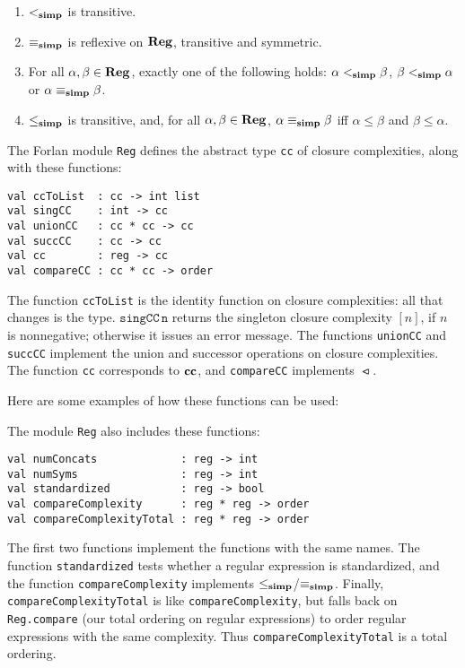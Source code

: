 \begin{proposition}
\begin{enumerate}[\quad(1)]
\item $\mathrel{<_{\mathbf{simp}}}$ is transitive.

\item $\mathrel{\equiv_{\mathbf{simp}}}$ is reflexive on $\mathbf{Reg}$, transitive and symmetric.

\item For all $\alpha,\beta\in\mathbf{Reg}$, exactly one of the following holds:
$\alpha\mathrel{<_{\mathbf{simp}}}\beta$, $\beta\mathrel{<_{\mathbf{simp}}}\alpha$ or $\alpha\mathrel{\equiv_{\mathbf{simp}}}\beta$.

\item $\mathrel{\leq_{\mathbf{simp}}}$ is transitive, and, for all $\alpha,\beta\in\mathbf{Reg}$,
$\alpha\mathrel{\equiv_{\mathbf{simp}}}\beta$ iff $\alpha\leq\beta$ and $\beta\leq\alpha$.
\end{enumerate}
\end{proposition}

The Forlan module \texttt{Reg} defines the abstract type \texttt{cc}
of closure complexities, along with these functions:
\begin{verbatim}
val ccToList  : cc -> int list
val singCC    : int -> cc
val unionCC   : cc * cc -> cc
val succCC    : cc -> cc
val cc        : reg -> cc
val compareCC : cc * cc -> order
\end{verbatim}
The function \texttt{ccToList} is the identity function on closure
complexities: all that changes is the type.  $\mathtt{singCC\,n}$
returns the singleton closure complexity $[n]$, if $n$ is nonnegative;
otherwise it issues an error message.  The functions \texttt{unionCC}
and \texttt{succCC} implement the union and successor operations on
closure complexities.  The function \texttt{cc} corresponds to $\mathbf{cc}$, and
\texttt{compareCC} implements $\ltcc$.

Here are some examples of how these functions can be used:


The module \texttt{Reg} also includes these functions:
\begin{verbatim}
val numConcats             : reg -> int
val numSyms                : reg -> int
val standardized           : reg -> bool
val compareComplexity      : reg * reg -> order
val compareComplexityTotal : reg * reg -> order
\end{verbatim}
The first two functions implement the functions with the same names.
The function \texttt{standardized} tests whether a regular expression
is standardized, and the function \texttt{compareComplexity} implements
$\mathrel{\leq_{\mathbf{simp}}}$/$\mathrel{\equiv_{\mathbf{simp}}}$. Finally, \texttt{compareComplexityTotal} is like
\texttt{compareComplexity}, but falls back on \texttt{Reg.compare}
(our total ordering on regular expressions) to order regular expressions
with the same complexity.  Thus \texttt{compareComplexityTotal} is
a total ordering.

